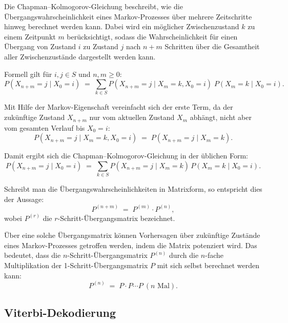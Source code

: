 Die Chapman--Kolmogorov-Gleichung beschreibt, wie die Übergangswahrscheinlichkeit eines Markov-Prozesses über mehrere Zeitschritte hinweg berechnet werden kann. 
Dabei wird ein möglicher Zwischenzustand $k$ zu einem Zeitpunkt $m$ berücksichtigt, sodass die Wahrscheinlichkeit für einen Übergang von Zustand $i$ zu Zustand $j$ nach $n+m$ Schritten über die Gesamtheit aller Zwischenzustände dargestellt werden kann.

Formell gilt für $i, j \in S$ und $n, m \geq 0$:
\begin{equation}
P(X_{n+m} = j \mid X_0 = i) \;=\; \sum_{k \in S} P(X_{n+m} = j \mid X_m = k, X_0 = i)\; P(X_m = k \mid X_0 = i).
\end{equation}

Mit Hilfe der Markov-Eigenschaft vereinfacht sich der erste Term, da der zukünftige Zustand $X_{n+m}$ nur vom aktuellen Zustand $X_m$ abhängt, nicht aber vom gesamten Verlauf bis $X_0 = i$:
\begin{equation}
P(X_{n+m} = j \mid X_m = k, X_0 = i) \;=\; P(X_{n+m} = j \mid X_m = k).
\end{equation}

Damit ergibt sich die Chapman--Kolmogorov-Gleichung in der üblichen Form:
\begin{equation}
P(X_{n+m} = j \mid X_0 = i) \;=\; \sum_{k \in S} P(X_{n+m} = j \mid X_m = k)\, P(X_m = k \mid X_0 = i).
\end{equation}

Schreibt man die Übergangswahrscheinlichkeiten in Matrixform, so entspricht dies der Aussage:
\begin{equation}
P^{(n+m)} \;=\; P^{(m)} \cdot P^{(n)},
\end{equation}
wobei $P^{(r)}$ die $r$-Schritt-Übergangsmatrix bezeichnet.

Über eine solche Übergangsmatrix können Vorhersagen über zukünftige Zustände eines Markov-Prozesses getroffen werden, indem die Matrix potenziert wird.
Das bedeutet, dass die $n$-Schritt-Übergangsmatrix $P^{(n)}$ durch die $n$-fache Multiplikation der 1-Schritt-Übergangsmatrix $P$ mit sich selbst berechnet werden kann:
\begin{equation}
P^{(n)} \;=\; P \cdot P \cdots P \ (n \text{ Mal}).
\end{equation} 


\subsection{Viterbi-Dekodierung}

